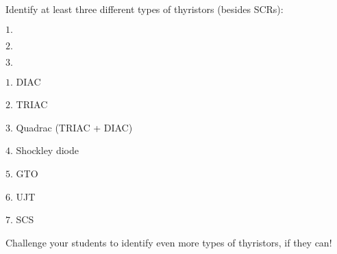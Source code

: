 

Identify at least three different types of thyristors (besides SCRs):

\medskip
\goodbreak
\item{$1.$} 
\item{$2.$} 
\item{$3.$} 
\medskip







\medskip
\goodbreak
\item{$1.$} DIAC
\item{$2.$} TRIAC
\item{$3.$} Quadrac (TRIAC + DIAC)
\item{$4.$} Shockley diode 
\item{$5.$} GTO
\item{$6.$} UJT
\item{$7.$} SCS
\medskip







Challenge your students to identify even more types of thyristors, if they can!




